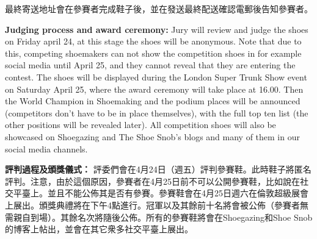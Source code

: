 \begin{paracol}{2}
        \vspace{1em}

        \switchcolumn
        最終寄送地址會在參賽者完成鞋子後，並在發送最終配送確認電郵後告知參賽者。
        \switchcolumn*

        \textbf{Judging process and award ceremony:}
        Jury will review and judge the shoes on Friday april 24, at this stage the shoes will be anonymous. Note that due to this, competing shoemakers can not show the competition shoes in for example social media until April 25, and they cannot reveal that they are entering the contest. The shoes will be displayed during the London Super Trunk Show event on Saturday April 25, where the award ceremony will take place at 16.00. Then the World Champion in Shoemaking and the podium places will be announced (competitors don't have to be in place themselves), with the full top ten list (the other positions will be revealed later). All competition shoes will also be showcased on Shoegazing and The Shoe Snob’s blogs and many of them in our social media channels.

        \vspace{1em}

        \switchcolumn
        \textbf{評判過程及頒獎儀式：}
        評委們會在4月24日（週五）評判參賽鞋。此時鞋子將匿名評判。注意，由於這個原因，參賽者在4月25日前不可以公開參賽鞋，比如說在社交平臺上。並且不能公佈其是否有參賽。參賽鞋會在4月25日週六在倫敦超級展會上展出。頒獎典禮將在下午4點進行。冠軍以及其餘前十名將會被公佈（參賽者無需親自到場）。其餘名次將隨後公佈。所有的參賽鞋將會在Shoegazing和Shoe Snob的博客上帖出，並會在其它衆多社交平臺上展出。
        \switchcolumn*


\end{paracol}
